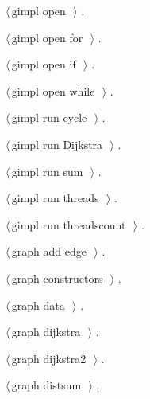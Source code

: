 \documentclass[12pt]{article}
\begin{document}
{\begin{list}{}{\setlength{\itemsep}{-\parsep}\setlength{\itemindent}{-\leftmargin}}
\item $\langle\,$gimpl open\nobreak\ {\footnotesize {}}$\,\rangle$ {\footnotesize {\NWtxtRefIn} .}
\item $\langle\,$gimpl open for\nobreak\ {\footnotesize {}}$\,\rangle$ {\footnotesize {\NWtxtRefIn} .}
\item $\langle\,$gimpl open if\nobreak\ {\footnotesize {}}$\,\rangle$ {\footnotesize {\NWtxtRefIn} .}
\item $\langle\,$gimpl open while\nobreak\ {\footnotesize {}}$\,\rangle$ {\footnotesize {\NWtxtRefIn} .}
\item $\langle\,$gimpl run cycle\nobreak\ {\footnotesize {}}$\,\rangle$ {\footnotesize {\NWtxtRefIn} .}
\item $\langle\,$gimpl run Dijkstra\nobreak\ {\footnotesize {}}$\,\rangle$ {\footnotesize {\NWtxtRefIn} .}
\item $\langle\,$gimpl run sum\nobreak\ {\footnotesize {}}$\,\rangle$ {\footnotesize {\NWtxtRefIn} .}
\item $\langle\,$gimpl run threads\nobreak\ {\footnotesize {}}$\,\rangle$ {\footnotesize {\NWtxtRefIn} .}
\item $\langle\,$gimpl run threadscount\nobreak\ {\footnotesize {}}$\,\rangle$ {\footnotesize {\NWtxtRefIn} .}
\item $\langle\,$graph add edge\nobreak\ {\footnotesize {}}$\,\rangle$ {\footnotesize {\NWtxtRefIn} .}
\item $\langle\,$graph constructors\nobreak\ {\footnotesize {}}$\,\rangle$ {\footnotesize {\NWtxtRefIn} .}
\item $\langle\,$graph data\nobreak\ {\footnotesize {}}$\,\rangle$ {\footnotesize {\NWtxtRefIn} .}
\item $\langle\,$graph dijkstra\nobreak\ {\footnotesize {}}$\,\rangle$ {\footnotesize {\NWtxtRefIn} .}
\item $\langle\,$graph dijkstra2\nobreak\ {\footnotesize {}}$\,\rangle$ {\footnotesize {\NWtxtRefIn} .}
\item $\langle\,$graph distsum\nobreak\ {\footnotesize {}}$\,\rangle$ {\footnotesize {\NWtxtRefIn} .}

\end{list}}
\end{document}
